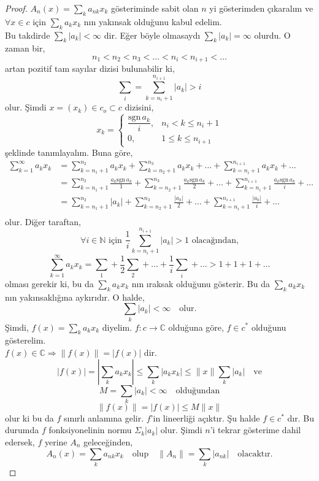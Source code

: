 \begin{proof}
$A_n(x)=\sum\limits_ka_{nk}x_k$ gösteriminde sabit olan $n$ yi gösterimden çıkaralım ve $\forall x\in c$ için $\sum\limits_ka_kx_k$ nın yakınsak olduğunu kabul edelim.\\ Bu takdirde $\sum\limits_k|a_k|<\infty$ dir. Eğer böyle olmasaydı $\sum\limits_k|a_k|=\infty$ olurdu. O zaman bir,
$$
n_1<n_2<n_3<\ldots<n_i<n_{i+1}<\ldots
$$
artan pozitif tam sayılar dizisi bulunabilir ki,
$$
\sum\limits_i=\sum\limits_{k=n_i+1}^{n_{i+1}}|a_k|>i
$$
olur. Şimdi $x=(x_k)\in c_o\subset c$ dizisini,
$$
x_k=
	\begin{cases}
		\dfrac{\text{sgn}\,a_k}{i}, & n_i<k\leq n_i+1\\
		0, &1\leq k\leq n_{i+1}
	\end{cases}
$$
şeklinde tanımlayalım. Buna göre,
$$\begin{aligned}
\sum\limits_{k=1}^\infty a_kx_k&=\sum\limits_{k=n_1+1}^{n_2}a_kx_k+\sum\limits_{k=n_2+1}^{n_3}a_kx_k+\ldots+\sum\limits_{k=n_i+1}^{n_{i+1}}a_kx_k+\ldots\\
&=\sum\limits_{k=n_1+1}^{n_2}\frac{a_k\text{sgn}\,a_k}{1}+\sum\limits_{k=n_2+1}^{n_3}\frac{a_k\text{sgn}\,a_k}{2}+\ldots+\sum\limits_{k=n_i+1}^{n_{i+1}}\frac{a_k\text{sgn}\,a_k}{i}+\ldots\\
&=\sum\limits_{k=n_1+1}^{n_2}|a_k|+\sum\limits_{k=n_2+1}^{n_3}\frac{|a_k|}{2}+\ldots+\sum\limits_{k=n_i+1}^{n_{i+1}}\frac{|a_k|}{i}+\ldots\\
\end{aligned}$$
olur. Diğer taraftan,
$$
\forall i\in\mathbb{N}\text{ için }\frac{1}{i}\sum\limits_{k=n_i+1}^{n_{i+1}}|a_k|>1\text{ olacağından,}
$$
$$
\sum_{k=1}^\infty a_kx_k=\sum_1+\frac{1}{2}\sum_2+\ldots+\frac{1}{i}\sum_i+\ldots>1+1+1+\ldots
$$
olması gerekir ki, bu da $\sum\limits_ka_kx_k$ nın ıraksak olduğunu gösterir. Bu da $\sum\limits_ka_kx_k$ nın yakınsaklığına aykırıdır. O halde,
$$
\sum\limits_k|a_k|<\infty\quad\text{olur.}
$$
 Şimdi, $f(x)=\sum\limits_ka_kx_k$ diyelim. $f:c\to \mathbb{C}$ olduğuna göre, $f\in c^*$ olduğunu gösterelim.\\[5pt]
$f(x)\in\mathbb{C}\Rightarrow\|f(x)\|=|f(x)|$ dir.
$$
|f(x)|=\left|\sum_ka_kx_k\right|\leq\sum_k|a_kx_k|\leq\|x\|\sum_k|a_k|\quad\text{ve}
$$
$$M=\sum_k|a_k|<\infty\quad\text{olduğundan}$$ $$\|f(x)\|=|f(x)|\leq M\|x\|$$ olur ki bu da $f$ sınırlı anlamına gelir. $f$'in lineerliği açıktır. Şu halde $f\in c^*$ dır. Bu durumda $f$ fonksiyonelinin normu $\Sigma_k|a_k|$ olur. Şimdi $n$'i tekrar gösterime dahil edersek, $f$ yerine $A_n$ geleceğinden,
$$
A_n(x)=\sum_ka_{nk}x_k\quad\text{olup}\quad\|A_n\|=\sum_k|a_{nk}|\quad\text{olacaktır.}
$$


\end{proof}
